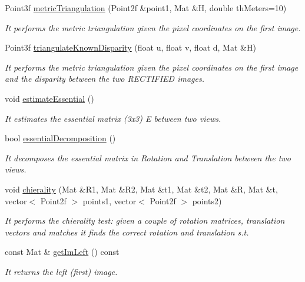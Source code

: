 \begin{DoxyCompactItemize}
Point3f \mbox{\hyperlink{classStereoCamera_a3cf53fac6336eea107a26bd5cdbbdd03}{metric\+Triangulation}} (Point2f \&point1, Mat \&H, double th\+Meters=10)
\begin{DoxyCompactList}\small\item\em It performs the metric triangulation given the pixel coordinates on the first image. \end{DoxyCompactList}\item 
Point3f \mbox{\hyperlink{classStereoCamera_a761ea623c4cde38b4fa1d798ef09b7ae}{triangulate\+Known\+Disparity}} (float u, float v, float d, Mat \&H)
\begin{DoxyCompactList}\small\item\em It performs the metric triangulation given the pixel coordinates on the first image and the disparity between the two R\+E\+C\+T\+I\+F\+I\+ED images. \end{DoxyCompactList}\item 
void \mbox{\hyperlink{classStereoCamera_ab2eded08bca185ac22cd6343cb4c85c8}{estimate\+Essential}} ()
\begin{DoxyCompactList}\small\item\em It estimates the essential matrix (3x3) E between two views. \end{DoxyCompactList}\item 
bool \mbox{\hyperlink{classStereoCamera_a180388e93b654802c7c56c18d206214b}{essential\+Decomposition}} ()
\begin{DoxyCompactList}\small\item\em It decomposes the essential matrix in Rotation and Translation between the two views. \end{DoxyCompactList}\item 
void \mbox{\hyperlink{classStereoCamera_aefb25fc2ecd8d0ce484e5981769dd635}{chierality}} (Mat \&R1, Mat \&R2, Mat \&t1, Mat \&t2, Mat \&R, Mat \&t, vector$<$ Point2f $>$ points1, vector$<$ Point2f $>$ points2)
\begin{DoxyCompactList}\small\item\em It performs the chierality test\+: given a couple of rotation matrices, translation vectors and matches it finds the correct rotation and translation s.\+t. \end{DoxyCompactList}\item 
const Mat \& \mbox{\hyperlink{classStereoCamera_ac0cb76a6994bd7ab915cb02d83cf8f8e}{get\+Im\+Left}} () const
\begin{DoxyCompactList}\small\item\em It returns the left (first) image. \end{DoxyCompactList}\item 

\end{DoxyCompactItemize}
